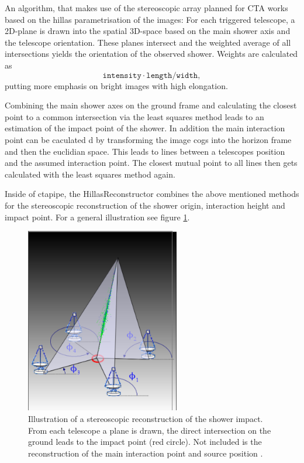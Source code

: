 An algorithm, that makes use of the stereoscopic array planned for CTA
works based on the hillas parametrisation of the images:
For each triggered telescope, a 2D-plane is drawn into the spatial 3D-space
based on the main shower 
axis and the telescope orientation. These planes intersect and 
the weighted average of all intersections yields the 
orientation of the observed shower.
Weights are calculated as 
$$
\texttt{intensity} \cdot \texttt{length} / \texttt{width},
$$
putting more emphasis on bright images with high elongation.

Combining the main shower axes on the ground frame
and calculating the closest point to a common intersection
via the least squares method leads to 
an estimation of the impact point of the shower.
In addition the main interaction point can be caculated 
d by transforming the image cogs into the horizon frame and 
then the euclidian space.
This leads to lines between a telescopes position and the assumed
interaction point. The closest mutual point to all lines
then gets calculated with the least squares method again.

Inside of ctapipe, the HillasReconstructor combines the
above mentioned methods for the stereoscopic reconstruction of the
shower origin, interaction height and impact point.
For a general illustration see figure \ref{fig:hillas_reconstructor}.


\begin{figure}
	\centering
	\includegraphics[width=0.6\textwidth]{images/hillas_reco.png}
	\caption{Illustration of a stereoscopic reconstruction of the shower impact.
    From each telescope a plane is drawn, the direct intersection 
    on the ground leads to the impact point (red circle).
    Not included is the reconstruction of the main interaction point
    and source position \cite{hillas_reco}.}
	\label{fig:hillas_reconstructor}
\end{figure}

